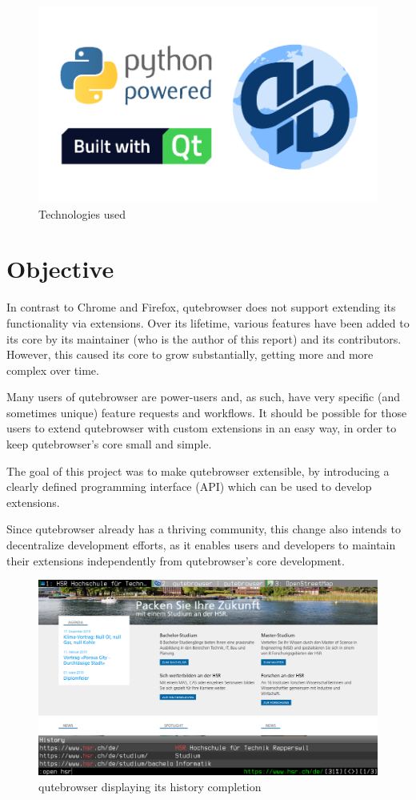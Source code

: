 \documentclass[a4paper,parskip=full]{scrreprt}
\begin{document}
\begin{figure}[H]
  \centering
  \includegraphics[width=0.7\linewidth]{img/logos.pdf}
  \caption{Technologies used}
\end{figure}

\section*{Objective}

In contrast to Chrome and Firefox, qutebrowser does not support extending its
functionality via extensions. Over its lifetime, various features have been
added to its core by its maintainer (who is the author of this report) and its
contributors. However, this caused its core to grow substantially, getting more
and more complex over time.

Many users of qutebrowser are power-users and, as such, have very specific (and
sometimes unique) feature requests and workflows. It should be possible for
those users to extend qutebrowser with custom extensions in an easy way, in
order to keep qutebrowser's core small and simple.

The goal of this project was to make qutebrowser extensible, by introducing a
clearly defined programming interface (API) which can be used to develop
extensions.

Since qutebrowser already has a thriving community, this change also intends to
decentralize development efforts, as it enables users and developers to maintain
their extensions independently from qutebrowser's core development.

\begin{figure}[H]
\includegraphics[width=\linewidth]{img/screenshot-intro.png}
\caption{qutebrowser displaying its history completion}
\end{figure}
\end{document}
